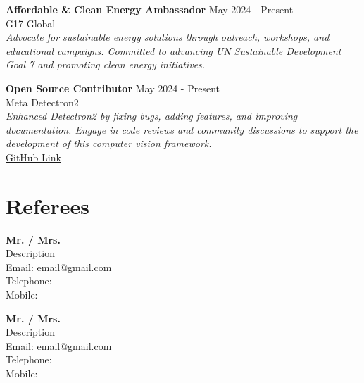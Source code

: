 \documentclass[10pt,letterpaper]{article}
\begin{document}
\textbf{Affordable \& Clean Energy Ambassador} \hfill May 2024 - Present \\
G17 Global \\
\textit{Advocate for sustainable energy solutions through outreach, workshops, and educational campaigns. Committed to advancing UN Sustainable Development Goal 7 and promoting clean energy initiatives.}

\textbf{Open Source Contributor} \hfill May 2024 - Present \\
Meta Detectron2 \\
\textit{Enhanced Detectron2 by fixing bugs, adding features, and improving documentation. Engage in code reviews and community discussions to support the development of this computer vision framework.} \\
\href{https://github.com/Programmer-RD-AI/detectron2}{GitHub Link}

\section*{Referees}
\textbf{Mr. / Mrs. } \\
Description \\
Email: \href{mailto:email@gmail.com}{email@gmail.com} \\
Telephone: \\
Mobile: 

\textbf{Mr. / Mrs. } \\
Description \\
Email: \href{mailto:email@gmail.com}{email@gmail.com} \\
Telephone: \\
Mobile: 
\end{document}

